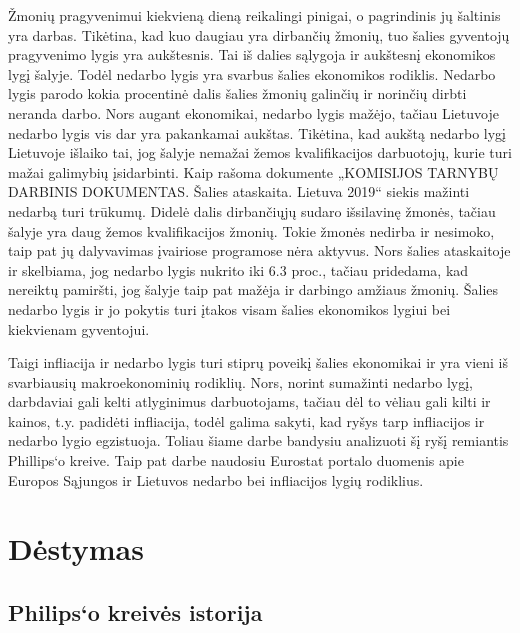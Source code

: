 \documentclass[11pt, titlepage]{article}
\begin{document}
Žmonių pragyvenimui kiekvieną dieną reikalingi pinigai, o pagrindinis jų šaltinis yra darbas. Tikėtina, kad kuo daugiau yra dirbančių žmonių, tuo šalies gyventojų pragyvenimo lygis yra aukštesnis. Tai iš dalies sąlygoja ir aukštesnį ekonomikos lygį šalyje. Todėl nedarbo lygis yra svarbus šalies ekonomikos rodiklis. Nedarbo lygis parodo kokia procentinė dalis šalies žmonių galinčių ir norinčių dirbti neranda darbo. Nors augant ekonomikai, nedarbo lygis mažėjo, tačiau Lietuvoje nedarbo lygis vis dar yra pakankamai aukštas. Tikėtina, kad aukštą nedarbo lygį Lietuvoje išlaiko tai, jog šalyje nemažai žemos kvalifikacijos darbuotojų, kurie turi mažai galimybių įsidarbinti. Kaip rašoma dokumente „KOMISIJOS TARNYBŲ DARBINIS DOKUMENTAS. Šalies ataskaita. Lietuva 2019“ siekis mažinti nedarbą turi trūkumų. Didelė dalis dirbančiųjų sudaro išsilavinę žmonės, tačiau šalyje yra daug žemos kvalifikacijos žmonių. Tokie žmonės nedirba ir nesimoko, taip pat jų dalyvavimas įvairiose programose nėra aktyvus. Nors šalies ataskaitoje ir skelbiama, jog nedarbo lygis nukrito iki 6.3 proc., tačiau pridedama, kad nereiktų pamiršti, jog šalyje taip pat mažėja ir darbingo amžiaus žmonių. Šalies nedarbo lygis ir jo pokytis turi įtakos visam šalies ekonomikos lygiui bei kiekvienam gyventojui.

Taigi infliacija ir nedarbo lygis turi stiprų poveikį šalies ekonomikai ir yra vieni iš svarbiausių makroekonominių rodiklių. Nors, norint sumažinti nedarbo lygį, darbdaviai gali kelti atlyginimus darbuotojams,  tačiau dėl to vėliau gali kilti ir kainos, t.y. padidėti infliacija, todėl galima sakyti, kad ryšys tarp infliacijos ir nedarbo lygio egzistuoja. Toliau šiame darbe bandysiu analizuoti šį ryšį remiantis Phillips‘o kreive. Taip pat darbe naudosiu Eurostat portalo duomenis apie Europos Sąjungos ir Lietuvos nedarbo bei infliacijos lygių rodiklius.

\newpage
\section{Dėstymas}
\subsection{Philips‘o kreivės istorija}
\end{document}
